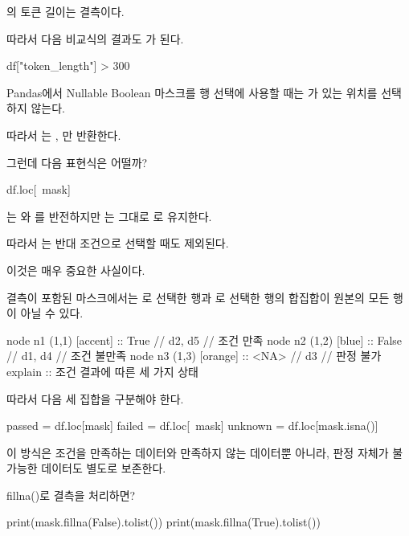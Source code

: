 의 토큰 길이는 결측이다.

따라서 다음 비교식의 결과도 가 된다.

\begin{dhkcode}
df["token_length"] > 300
\end{dhkcode}

Pandas에서 Nullable Boolean 마스크를 행 선택에 사용할 때는 가 있는 위치를 선택하지 않는다.

따라서 는 , 만 반환한다.

그런데 다음 표현식은 어떨까?

\begin{dhkcode}
df.loc[~mask]
\end{dhkcode}

\zsh{~}는 와 를 반전하지만 는 그대로 로 유지한다.

따라서 는 반대 조건으로 선택할 때도 제외된다.

이것은 매우 중요한 사실이다.

결측이 포함된 마스크에서는 로 선택한 행과 로 선택한 행의 합집합이 원본의 모든 행이 아닐 수 있다.

\begin{dhkgraph}[uniform]
node n1 (1,1) [accent] :: True // d2, d5 // 조건 만족
node n2 (1,2) [blue] :: False // d1, d4 // 조건 불만족
node n3 (1,3) [orange] :: <NA> // d3 // 판정 불가
explain :: 조건 결과에 따른 세 가지 상태
\end{dhkgraph}

따라서 다음 세 집합을 구분해야 한다.

\begin{dhkcode}
passed = df.loc[mask]
failed = df.loc[~mask]
unknown = df.loc[mask.isna()]
\end{dhkcode}

이 방식은 조건을 만족하는 데이터와 만족하지 않는 데이터뿐 아니라, 판정 자체가 불가능한 데이터도 별도로 보존한다.

\begin{dhknote}
\begin{dhksmry}[centered]
fillna()로 결측을 처리하면?
\end{dhksmry}
\end{dhknote}

\begin{dhkcode}
print(mask.fillna(False).tolist())
print(mask.fillna(True).tolist())
\end{dhkcode}

